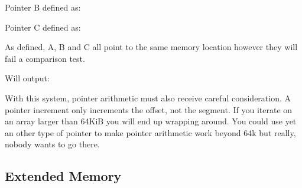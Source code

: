 \documentclass[book.tex]{subfiles}
\begin{document}
\bigskip

Pointer B defined as:\\
\par
\begin{minipage}{\textwidth}

\end{minipage}

\bigskip

Pointer C defined as:\\
\par
\begin{minipage}{\textwidth}

\end{minipage}

As defined, A, B and C all point to the same memory location however they will fail a comparison test.\\

\begin{minipage}{\textwidth}

\end{minipage}
\par
Will output:\\

\begin{minipage}{\textwidth}

\end{minipage}
\par

With this system, pointer arithmetic must also receive careful consideration. A  pointer increment only increments the offset, not the segment. If you iterate on an array larger than 64KiB you will end up wrapping around. You could use yet an other type of pointer  to make pointer arithmetic work beyond 64k but really, nobody wants to go there.




  \subsection{Extended Memory}
\end{document}
